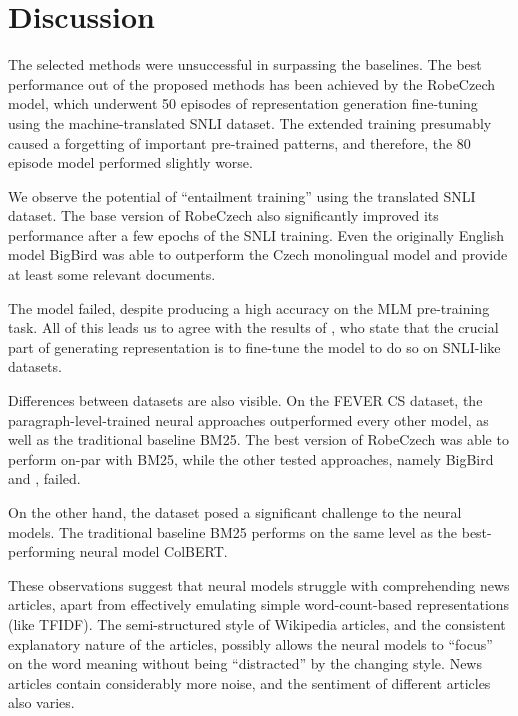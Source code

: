 \section{Discussion}

The selected methods were unsuccessful in surpassing the baselines.
The best performance out of the proposed methods has been achieved by the RobeCzech model, which underwent 50 episodes of representation generation fine-tuning using the machine-translated SNLI dataset.
The extended training presumably caused a forgetting of important pre-trained patterns, and therefore, the 80 episode model performed slightly worse.

We observe the potential of ``entailment training'' using the translated SNLI dataset. 
The base version of RobeCzech also significantly improved its performance after a few epochs of the SNLI training.
Even the originally English model BigBird was able to outperform the Czech monolingual model \nystr{} and provide at least some relevant documents.

The \nystr{} model failed, despite producing a high accuracy on the MLM pre-training task. 
All of this leads us to agree with the results of \citet{sbert}, who state that the crucial part of generating representation is to fine-tune the model to do so on SNLI-like datasets.

Differences between datasets are also visible.
On the FEVER CS dataset, the paragraph-level-trained neural approaches outperformed every other model, as well as the traditional baseline BM25. 
The best version of RobeCzech was able to perform on-par with BM25, while the other tested approaches, namely BigBird and \nystr{}, failed.

On the other hand, the \CTK{} dataset posed a significant challenge to the neural models.
The traditional baseline BM25 performs on the same level as the best-performing neural model ColBERT.

These observations suggest that neural models struggle with comprehending \CTK{} news articles, apart from effectively emulating simple word-count-based representations (like TFIDF).
The semi-structured style of Wikipedia articles, and the consistent explanatory nature of the articles, possibly allows the neural models to ``focus'' on the word meaning without being ``distracted'' by the changing style.
News articles contain considerably more noise, and the sentiment of different articles also varies.